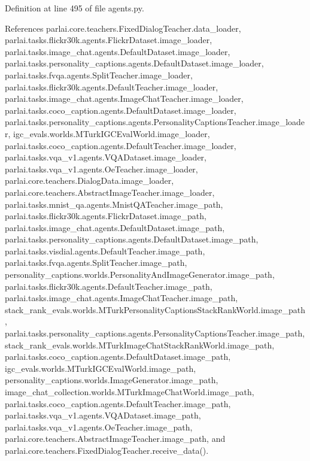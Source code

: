 Definition at line 495 of file agents.\+py.



References parlai.\+core.\+teachers.\+Fixed\+Dialog\+Teacher.\+data\+\_\+loader, parlai.\+tasks.\+flickr30k.\+agents.\+Flickr\+Dataset.\+image\+\_\+loader, parlai.\+tasks.\+image\+\_\+chat.\+agents.\+Default\+Dataset.\+image\+\_\+loader, parlai.\+tasks.\+personality\+\_\+captions.\+agents.\+Default\+Dataset.\+image\+\_\+loader, parlai.\+tasks.\+fvqa.\+agents.\+Split\+Teacher.\+image\+\_\+loader, parlai.\+tasks.\+flickr30k.\+agents.\+Default\+Teacher.\+image\+\_\+loader, parlai.\+tasks.\+image\+\_\+chat.\+agents.\+Image\+Chat\+Teacher.\+image\+\_\+loader, parlai.\+tasks.\+coco\+\_\+caption.\+agents.\+Default\+Dataset.\+image\+\_\+loader, parlai.\+tasks.\+personality\+\_\+captions.\+agents.\+Personality\+Captions\+Teacher.\+image\+\_\+loader, igc\+\_\+evals.\+worlds.\+M\+Turk\+I\+G\+C\+Eval\+World.\+image\+\_\+loader, parlai.\+tasks.\+coco\+\_\+caption.\+agents.\+Default\+Teacher.\+image\+\_\+loader, parlai.\+tasks.\+vqa\+\_\+v1.\+agents.\+V\+Q\+A\+Dataset.\+image\+\_\+loader, parlai.\+tasks.\+vqa\+\_\+v1.\+agents.\+Oe\+Teacher.\+image\+\_\+loader, parlai.\+core.\+teachers.\+Dialog\+Data.\+image\+\_\+loader, parlai.\+core.\+teachers.\+Abstract\+Image\+Teacher.\+image\+\_\+loader, parlai.\+tasks.\+mnist\+\_\+qa.\+agents.\+Mnist\+Q\+A\+Teacher.\+image\+\_\+path, parlai.\+tasks.\+flickr30k.\+agents.\+Flickr\+Dataset.\+image\+\_\+path, parlai.\+tasks.\+image\+\_\+chat.\+agents.\+Default\+Dataset.\+image\+\_\+path, parlai.\+tasks.\+personality\+\_\+captions.\+agents.\+Default\+Dataset.\+image\+\_\+path, parlai.\+tasks.\+visdial.\+agents.\+Default\+Teacher.\+image\+\_\+path, parlai.\+tasks.\+fvqa.\+agents.\+Split\+Teacher.\+image\+\_\+path, personality\+\_\+captions.\+worlds.\+Personality\+And\+Image\+Generator.\+image\+\_\+path, parlai.\+tasks.\+flickr30k.\+agents.\+Default\+Teacher.\+image\+\_\+path, parlai.\+tasks.\+image\+\_\+chat.\+agents.\+Image\+Chat\+Teacher.\+image\+\_\+path, stack\+\_\+rank\+\_\+evals.\+worlds.\+M\+Turk\+Personality\+Captions\+Stack\+Rank\+World.\+image\+\_\+path, parlai.\+tasks.\+personality\+\_\+captions.\+agents.\+Personality\+Captions\+Teacher.\+image\+\_\+path, stack\+\_\+rank\+\_\+evals.\+worlds.\+M\+Turk\+Image\+Chat\+Stack\+Rank\+World.\+image\+\_\+path, parlai.\+tasks.\+coco\+\_\+caption.\+agents.\+Default\+Dataset.\+image\+\_\+path, igc\+\_\+evals.\+worlds.\+M\+Turk\+I\+G\+C\+Eval\+World.\+image\+\_\+path, personality\+\_\+captions.\+worlds.\+Image\+Generator.\+image\+\_\+path, image\+\_\+chat\+\_\+collection.\+worlds.\+M\+Turk\+Image\+Chat\+World.\+image\+\_\+path, parlai.\+tasks.\+coco\+\_\+caption.\+agents.\+Default\+Teacher.\+image\+\_\+path, parlai.\+tasks.\+vqa\+\_\+v1.\+agents.\+V\+Q\+A\+Dataset.\+image\+\_\+path, parlai.\+tasks.\+vqa\+\_\+v1.\+agents.\+Oe\+Teacher.\+image\+\_\+path, parlai.\+core.\+teachers.\+Abstract\+Image\+Teacher.\+image\+\_\+path, and parlai.\+core.\+teachers.\+Fixed\+Dialog\+Teacher.\+receive\+\_\+data().

